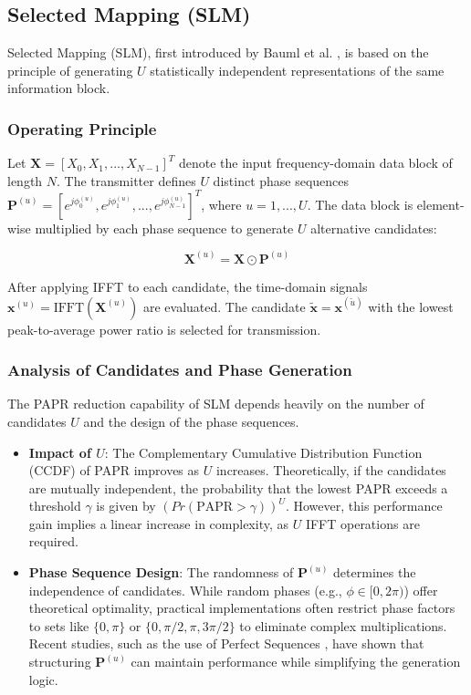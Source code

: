 \documentclass[12pt, a4paper, onecolumn]{article}
\begin{document}
\subsection{Selected Mapping (SLM)}
Selected Mapping (SLM), first introduced by Bauml et al. \cite{ref5}, is based on the principle of generating $U$ statistically independent representations of the same information block.

\subsubsection{Operating Principle}
Let $\mathbf{X} = [X_0, X_1, ..., X_{N-1}]^T$ denote the input frequency-domain data block of length $N$. The transmitter defines $U$ distinct phase sequences $\mathbf{P}^{(u)} = [e^{j\phi_{0}^{(u)}}, e^{j\phi_{1}^{(u)}}, ..., e^{j\phi_{N-1}^{(u)}}]^T$, where $u = 1, ..., U$. The data block is element-wise multiplied by each phase sequence to generate $U$ alternative candidates:

\begin{equation}
    \mathbf{X}^{(u)} = \mathbf{X} \odot \mathbf{P}^{(u)}
\end{equation}

After applying IFFT to each candidate, the time-domain signals $\mathbf{x}^{(u)} = \text{IFFT}(\mathbf{X}^{(u)})$ are evaluated. The candidate $\tilde{\mathbf{x}} = \mathbf{x}^{(\tilde{u})}$ with the lowest peak-to-average power ratio is selected for transmission.

\subsubsection{Analysis of Candidates and Phase Generation}
The PAPR reduction capability of SLM depends heavily on the number of candidates $U$ and the design of the phase sequences.

\begin{itemize}
    \item \textbf{Impact of $U$}: The Complementary Cumulative Distribution Function (CCDF) of PAPR improves as $U$ increases. Theoretically, if the candidates are mutually independent, the probability that the lowest PAPR exceeds a threshold $\gamma$ is given by $(Pr(\text{PAPR} > \gamma))^U$. However, this performance gain implies a linear increase in complexity, as $U$ IFFT operations are required.
    \item \textbf{Phase Sequence Design}: The randomness of $\mathbf{P}^{(u)}$ determines the independence of candidates. While random phases (e.g., $\phi \in [0, 2\pi)$) offer theoretical optimality, practical implementations often restrict phase factors to sets like $\{0, \pi\}$ or $\{0, \pi/2, \pi, 3\pi/2\}$ to eliminate complex multiplications. Recent studies, such as the use of Perfect Sequences \cite{ref7}, have shown that structuring $\mathbf{P}^{(u)}$ can maintain performance while simplifying the generation logic.
\end{itemize}
\end{document}

